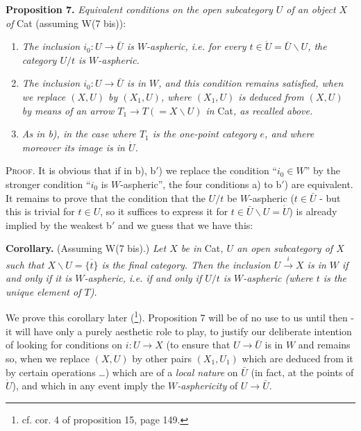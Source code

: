 \documentclass[11pt]{article}
\newcommand{\msp}[1]{\marginpar{\footnotesize [#1]}}
\begin{document}
\textbf{Proposition 7.} \textit{Equivalent conditions on the open subcategory $U$ of an object $X$ of} Cat (assuming W(7 bis)):

\begin{enumerate}[label={}, leftmargin=*]
\item[\textit{a)}] \textit{The inclusion $i_0:U\longrightarrow\bar U$ is $W$-aspheric, i.e. for every $t\in\dot U=\bar U\backslash U$, the category $U/t$ is $W$-aspheric.}
\item[\textit{b)}] \textit{The inclusion $i_0:U\longrightarrow\bar U$ is in $W$, and this condition remains satisfied, when we replace $(X,U)$ by $(X_1,U)$, where $(X_1,U)$ is deduced from $(X,U)$ by means of an arrow $T_1\longrightarrow T(=X\backslash U)$ in} Cat\textit{, as recalled above.}
\item[\textit{b$'$)}] \textit{As in b), in the case where $T_1$ is the one-point category $e$, and where moreover its image is in $\dot U$.}
\end{enumerate}

\textsc{Proof}. It is obvious that if in b), b$'$) we replace the condition ``$i_0\in W$'' by the stronger condition ``$i_0$ is $W$-aspheric'', the four conditions a) to b$'$) are equivalent. It remains to prove that the condition that the $U/t$ be $W$-aspheric ($t\in\bar U$ - but this is trivial for $t\in U$, so it suffices to express it for $t\in\bar U\backslash U=\dot U$) is already implied by the weakest b$'$ and we guess that we have this:

\msp{page 85}

\textbf{Corollary.} (Assuming W(7 bis).) \textit{Let $X$ be in} Cat\textit{, $U$ an open subcategory of $X$ such that $X\backslash U=\overline{\{t\}}$ is the final category. Then the inclusion $U\xrightarrow{i}X$ is in $W$ if and only if it is $W$-aspheric, i.e. if and only if $U/t$ is $W$-aspheric (where $t$ is the unique element of $T$).}

We prove this corollary later (\footnote[65]{cf. cor. 4 of proposition 15, page 149.}). Proposition 7 will be of no use to us until then - it will have only a purely aesthetic role to play, to justify our deliberate intention of looking for conditions on $i:U\longrightarrow X$ (to ensure that $U\longrightarrow\bar U$ is in $W$ and remains so, when we replace $(X,U)$ by other pairs $(X_1,U_1)$ which are deduced from it by certain operations \dots) which
\msp{page 86}
are of a \textit{local nature} on $\bar U$ (in fact, at the points of $\dot U$), and which in any event imply the \textit{$W$-asphericity} of $U\longrightarrow\bar U$.
\end{document}

